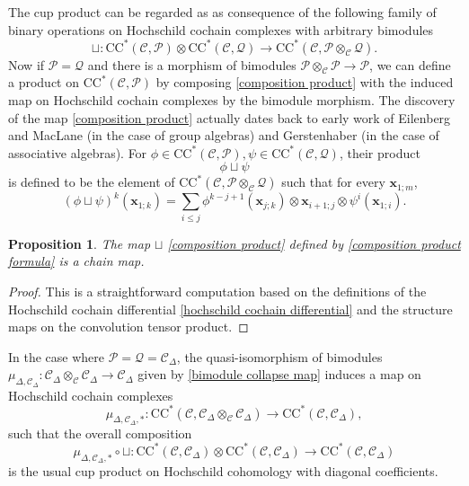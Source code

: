 \documentclass[11pt]{amsproc}
\def\cP{\mathcal{P}}
\def\cQ{\mathcal{Q}}
\def\cc{\mathcal{C}}
\def\r#1{\mathrm{#1}}
\def\D{\Delta}
\newtheorem{prop}[lem]{Proposition}
\theoremstyle{remark}
\numberwithin{equation}{section}
\begin{document}
The cup product can be regarded as as consequence of the following family of binary operations on Hochschild cochain complexes with arbitrary bimodules
\begin{equation}\label{composition product}
\sqcup: \r{CC}^{*}(\cc, \cP) \otimes \r{CC}^{*}(\cc, \cQ) \to \r{CC}^{*}(\cc, \cP \otimes_{\cc} \cQ).
\end{equation}
Now if $\cP = \cQ$ and there is a morphism of bimodules $\cP \otimes_{\cc} \cP \to \cP$, 
we can define a product on $\r{CC}^{*}(\cc, \cP)$ by composing \eqref{composition product} with the induced map on Hochschild cochain complexes by the bimodule morphism.
The discovery of the map \eqref{composition product} actually dates back to early work of Eilenberg and MacLane \cite{eilenberg-maclane} (in the case of group algebras) and Gerstenhaber \cite{gerstenhaber} (in the case of associative algebras).
For $\phi \in \r{CC}^{*}(\cc, \cP), \psi \in \r{CC}^{*}(\cc, \cQ)$, their product
\begin{equation}
\phi \sqcup \psi
\end{equation}
is defined to be the element of $\r{CC}^{*}(\cc, \cP \otimes_{\cc} \cQ)$ such that for every $\mathbf{x}_{1; m}$,
\begin{equation}\label{composition product formula}
(\phi \sqcup \psi)^{k} (\mathbf{x}_{1; k}) = \sum_{i \le j} \phi^{k-j+1}(\mathbf{x}_{j; k}) \otimes \mathbf{x}_{i+1; j} \otimes \psi^{i}(\mathbf{x}_{1; i}).
\end{equation}

\begin{prop}\label{prop: composition product chain map}
The map $\sqcup$ \eqref{composition product} defined by \eqref{composition product formula} is a chain map.
\end{prop}
\begin{proof}
This is a straightforward computation based on the definitions of the Hochschild cochain differential \eqref{hochschild cochain differential} and the structure maps on the convolution tensor product.
\end{proof}

In the case where $\cP = \cQ = \cc_{\D}$, the quasi-isomorphism of bimodules $\mu_{\D, \cc_{\D}}: \cc_{\D} \otimes_{\cc} \cc_{\D} \to \cc_{\D}$ given by \eqref{bimodule collapse map} induces a map on Hochschild cochain complexes
\[
\mu_{\D, \cc_{\D}, *}: \r{CC}^{*}(\cc, \cc_{\D} \otimes_{\cc} \cc_{\D}) \to \r{CC}^{*}(\cc, \cc_{\D}),
\]
such that the overall composition
\[
\mu_{\D, \cc_{\D}, *} \circ \sqcup: \r{CC}^{*}(\cc, \cc_{\D}) \otimes \r{CC}^{*}(\cc, \cc_{\D}) \to \r{CC}^{*}(\cc, \cc_{\D})
\]
is the usual cup product on Hochschild cohomology with diagonal coefficients.
\end{document}
